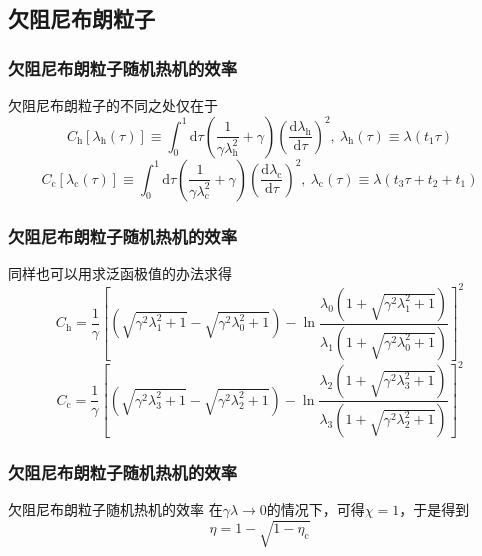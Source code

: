 \documentclass{beamer}
\newcommand{\DD}[2]{\frac{\mathrm{d} #1}{\mathrm{d} #2}}
\begin{document}
\subsection{欠阻尼布朗粒子}
\begin{frame}
\frametitle{欠阻尼布朗粒子随机热机的效率}
欠阻尼布朗粒子的不同之处仅在于
\begin{equation}
    C_{\mathrm{h}} [\lambda_{\mathrm{h}}(\tau)]\equiv \int_{{0}}^{{1}} \mathrm{d} \tau \left(\frac{1}{\gamma{\lambda_{\mathrm{h}}^{2}}} +\gamma  \right)\left({\DD{\lambda_{\mathrm{h}}}{\tau}}\right)^{2},\ \lambda_{\mathrm{h}}(\tau)\equiv\lambda(t_1 \tau)
    \label{eq3.46}
\end{equation}
\begin{equation}
    C_{\mathrm{c}} [\lambda_{\mathrm{c}}(\tau)]\equiv \int_{{0}}^{{1}} \mathrm{d} \tau \left(\frac{1}{\gamma{\lambda_{\mathrm{c}}^{2}}} +\gamma  \right)\left({\DD{\lambda_{\mathrm{c}}}{\tau}}\right)^{2},\ \lambda_{\mathrm{c}}(\tau)\equiv\lambda(t_3 \tau + t_2 +t_1)
    \label{eq3.46.5}
\end{equation}

\end{frame}

\begin{frame}
\frametitle{欠阻尼布朗粒子随机热机的效率}
同样也可以用求泛函极值的办法求得
\begin{equation}
    C_{\mathrm{h}} =\frac{1}{\gamma} \left[\left(\sqrt{\gamma^{2} \lambda_{1} ^{2}+1}-\sqrt{\gamma^{2} \lambda_{0} ^{2}+1}\right)-\ln \frac{\lambda_{0}\left(1+\sqrt{\gamma^{2} \lambda_{1} ^{2}+1}\right) }{\lambda_{1} \left(1+\sqrt{\gamma^{2} \lambda_{0} ^{2}+1}\right)}\right]^2
    \label{eq41}
\end{equation}
\begin{equation}
    C_{\mathrm{c}} =\frac{1}{\gamma} \left[\left(\sqrt{\gamma^{2} \lambda_{3} ^{2}+1}-\sqrt{\gamma^{2} \lambda_{2} ^{2}+1}\right)-\ln \frac{\lambda_{2}\left(1+\sqrt{\gamma^{2} \lambda_{3} ^{2}+1}\right) }{\lambda_{3} \left(1+\sqrt{\gamma^{2} \lambda_{2} ^{2}+1}\right)}\right]^2
    \label{eq42}
\end{equation}
\end{frame}

\begin{frame}
\frametitle{欠阻尼布朗粒子随机热机的效率}
\begin{alertblock}{欠阻尼布朗粒子随机热机的效率}
    在$\gamma \lambda \to 0$的情况下，可得$\chi=1$，于是得到
    \begin{equation}
        \eta=1-\sqrt{1-\eta_{\mathrm{c}}}
        \label{eq3.53}
    \end{equation}   
\end{alertblock}
\end{frame}
\end{document}
